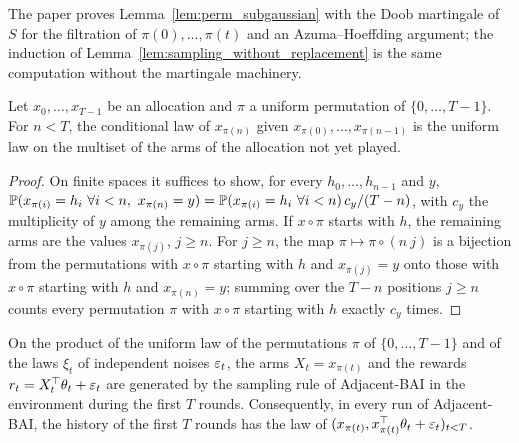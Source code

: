 \begin{remark}
  The paper proves Lemma~\ref{lem:perm_subgaussian} with the Doob martingale of $S$ for the
  filtration of $\pi(0), \dots, \pi(t)$ and an Azuma--Hoeffding argument; the induction of
  Lemma~\ref{lem:sampling_without_replacement} is the same computation without the martingale
  machinery.
\end{remark}

\begin{lemma}
  \label{lem:perm_sampling}
  \leanok
  Let $x_0, \dots, x_{T-1}$ be an allocation and $\pi$ a uniform permutation of
  $\{0, \dots, T - 1\}$. For $n < T$, the conditional law of $x_{\pi(n)}$ given
  $x_{\pi(0)}, \dots, x_{\pi(n-1)}$ is the uniform law on the multiset of the arms of the
  allocation not yet played.
\end{lemma}

\begin{proof}
  \leanok
  On finite spaces it suffices to show, for every $h_0, \dots, h_{n-1}$ and $y$,
  $\Prob(x_{\pi(i)} = h_i \ \forall i < n,\ x_{\pi(n)} = y)
  = \Prob(x_{\pi(i)} = h_i \ \forall i < n) \, c_y / (T - n)$, with $c_y$ the multiplicity of $y$
  among the remaining arms. If $x \circ \pi$ starts with $h$, the remaining arms are the values
  $x_{\pi(j)}$, $j \ge n$. For $j \ge n$, the map $\pi \mapsto \pi \circ (n\ j)$ is a bijection
  from the permutations with $x \circ \pi$ starting with $h$ and $x_{\pi(j)} = y$ onto those with
  $x \circ \pi$ starting with $h$ and $x_{\pi(n)} = y$; summing over the $T - n$ positions
  $j \ge n$ counts every permutation $\pi$ with $x \circ \pi$ starting with $h$ exactly $c_y$
  times.
\end{proof}

\begin{lemma}
  \label{lem:run_adjacent_bai}
  \leanok
  On the product of the uniform law of the permutations $\pi$ of $\{0, \dots, T - 1\}$ and of the
  laws $\xi_t$ of independent noises $\varepsilon_t$, the arms $X_t = x_{\pi(t)}$ and the rewards
  $r_t = X_t^\top \theta_t + \varepsilon_t$ are generated by the sampling rule of Adjacent-BAI in the
  environment during the first $T$ rounds. Consequently, in every run of Adjacent-BAI, the history
  of the first $T$ rounds has the law of $(x_{\pi(t)}, x_{\pi(t)}^\top \theta_t + \varepsilon_t)_{t < T}$.
\end{lemma}

